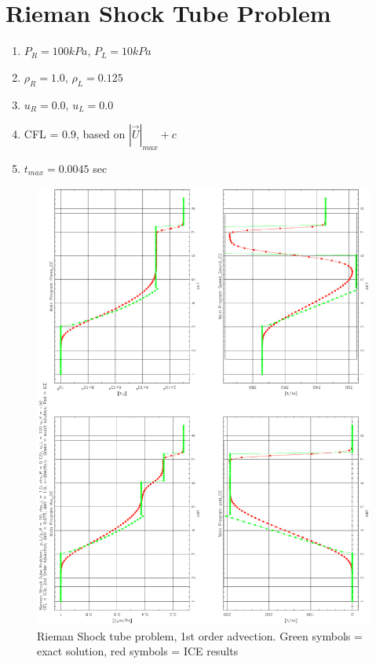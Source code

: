 \documentclass[fleqn]{article}
\begin{document}
\section{Rieman Shock Tube Problem}
\begin{enumerate}
    \item{$P_R = 100kPa$, $P_L = 10kPa$}
    \item{$\rho_R = 1.0$, $\rho_L = 0.125$}
    \item{$u_R = 0.0$, $u_L = 0.0$}
    \item{CFL = 0.9, based on $|\vec {U}|_{max} + c$}
    \item{$t_{max} = 0.0045$ sec}
\end{enumerate}


\begin{figure}[h]
\includegraphics[angle = 270, scale=.7]{Rieman_2.ps}
\caption{Rieman Shock tube problem, 1st order advection.  Green symbols = exact solution, red symbols = ICE results}
\label{fig:p_eq}
\end{figure}
\end{document}
